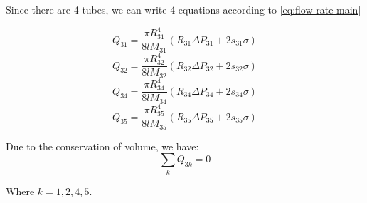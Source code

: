 	

	Since there are 4 tubes, we can write 4 equations according to \ref{eq:flow-rate-main}
	
	\[ Q_{31} = \frac{\pi R_{31}^4}{8lM_{31}}(R_{31}\Delta P_{31} + 2s_{31}\sigma) \]
	\[ Q_{32} = \frac{\pi R_{32}^4}{8lM_{32}}(R_{32}\Delta P_{32} + 2s_{32}\sigma) \]
	\[ Q_{34} = \frac{\pi R_{34}^4}{8lM_{34}}(R_{34}\Delta P_{34} + 2s_{34}\sigma) \]
	\[ Q_{35} = \frac{\pi R_{35}^4}{8lM_{35}}(R_{35}\Delta P_{35} + 2s_{35}\sigma) \]

	Due to the conservation of volume, we have:
	\[ \sum_{k} Q_{3k} = 0 \]
	
	Where $k = {1, 2, 4, 5}$.
